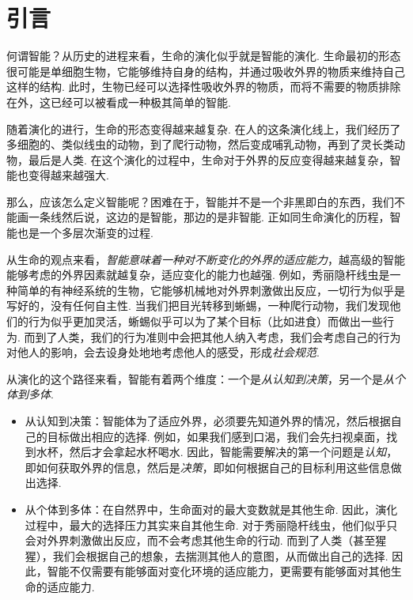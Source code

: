 \chapter{引言}

何谓智能？从历史的进程来看，生命的演化似乎就是智能的演化. 生命最初的形态很可能是单细胞生物，它能够维持自身的结构，并通过吸收外界的物质来维持自己这样的结构. 此时，生物已经可以选择性吸收外界的物质，而将不需要的物质排除在外，这已经可以被看成一种极其简单的智能. 

随着演化的进行，生命的形态变得越来越复杂. 在人的这条演化线上，我们经历了多细胞的、类似线虫的动物，到了爬行动物，然后变成哺乳动物，再到了灵长类动物，最后是人类. 在这个演化的过程中，生命对于外界的反应变得越来越复杂，智能也变得越来越强大. 

那么，应该怎么定义智能呢？困难在于，智能并不是一个非黑即白的东西，我们不能画一条线然后说，这边的是智能，那边的是非智能. 正如同生命演化的历程，智能也是一个多层次渐变的过程. 

从生命的观点来看，\textit{智能意味着一种对不断变化的外界的适应能力}，越高级的智能能够考虑的外界因素就越复杂，适应变化的能力也越强. 例如，秀丽隐杆线虫是一种简单的有神经系统的生物，它能够机械地对外界刺激做出反应，一切行为似乎是写好的，没有任何自主性. 当我们把目光转移到蜥蜴，一种爬行动物，我们发现他们的行为似乎更加灵活，蜥蜴似乎可以为了某个目标（比如进食）而做出一些行为. 而到了人类，我们的行为准则中会把其他人纳入考虑，我们会考虑自己的行为对他人的影响，会去设身处地地考虑他人的感受，形成\textit{社会规范}.~\cite{tomaselloEvolutionAgency2022}

从演化的这个路径来看，智能有着两个维度：一个是\textit{从认知到决策}，另一个是\textit{从个体到多体}. 
\begin{itemize}
    \item 从认知到决策：智能体为了适应外界，必须要先知道外界的情况，然后根据自己的目标做出相应的选择. 例如，如果我们感到口渴，我们会先扫视桌面，找到水杯，然后才会拿起水杯喝水. 因此，智能需要解决的第一个问题是\textit{认知}，即如何获取外界的信息，然后是\textit{决策}，即如何根据自己的目标利用这些信息做出选择. 
    \item 从个体到多体：在自然界中，生命面对的最大变数就是其他生命. 因此，演化过程中，最大的选择压力其实来自其他生命. 对于秀丽隐杆线虫，他们似乎只会对外界刺激做出反应，而不会考虑其他生命的行动. 而到了人类（甚至猩猩），我们会根据自己的想象，去揣测其他人的意图，从而做出自己的选择. 因此，智能不仅需要有能够面对变化环境的适应能力，更需要有能够面对其他生命的适应能力. 
\end{itemize}

